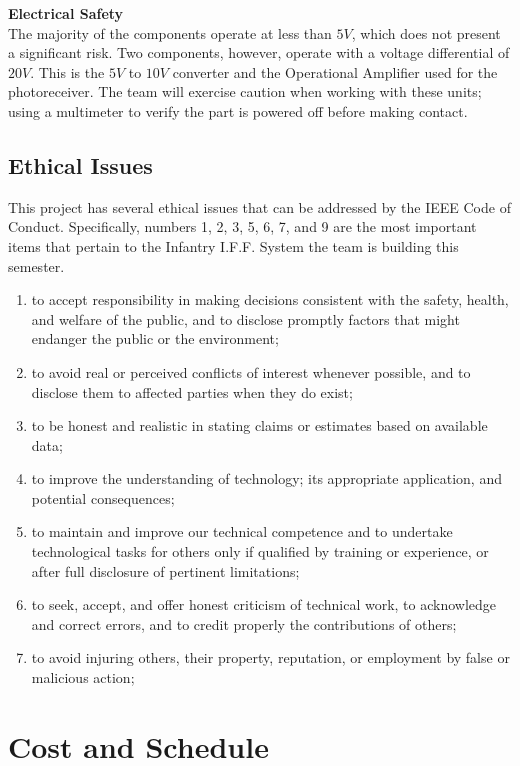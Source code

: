 \documentclass[letterpaper,10pt]{article}
\makeatletter
\newcommand{\skipitems}[1]{%
	\addtocounter{\@enumctr}{#1}%
}
\makeatother
\begin{document}
\begin{spacing}{1.15}
\normalsize\textbf{Electrical Safety} \\
The majority of the components operate at less than $5V$, which does not present a significant risk. Two components, however, operate with a voltage differential of $20V$. This is the $5V$ to $10V$ converter and the Operational Amplifier used for the photoreceiver. The team will exercise caution when working with these units; using a multimeter to verify the part is powered off before making contact. 


\subsection{Ethical Issues}
This project has several ethical issues that can be addressed by the IEEE Code of Conduct. Specifically, numbers 1, 2, 3, 5, 6, 7, and 9 are the most important items that pertain to the Infantry I.F.F. System the team is building this semester. 
\begin{enumerate}
\item to accept responsibility in making decisions consistent with the safety, health, and welfare of the public, and to disclose promptly factors that might endanger the public or the environment;
\item to avoid real or perceived conflicts of interest whenever possible, and to disclose them to affected parties when they do exist;
\item to be honest and realistic in stating claims or estimates based on available data;  
\skipitems{1}
\item to improve the understanding of technology; its appropriate application, and potential consequences;  
\item to maintain and improve our technical competence and to undertake technological tasks for others only if qualified by training or experience, or after full disclosure of pertinent limitations;  
\item to seek, accept, and offer honest criticism of technical work, to acknowledge and correct errors, and to credit properly the contributions of others;  
\skipitems{1}
\item to avoid injuring others, their property, reputation, or employment by false or malicious action;  
\end{enumerate}

\clearpage
\section{Cost and Schedule}


\end{spacing}
\end{document}
